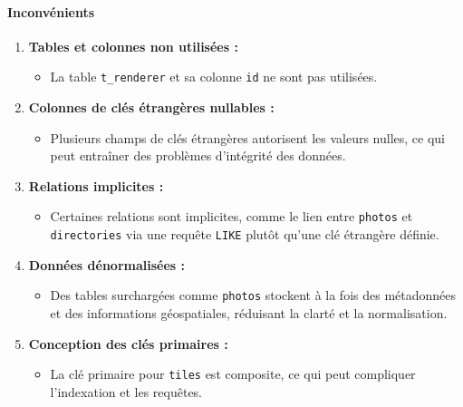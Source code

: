 \paragraph{Inconvénients}
\begin{enumerate}
    \item \textbf{Tables et colonnes non utilisées :}
          \begin{itemize}
              \item La table \texttt{t_renderer} et sa colonne \texttt{id} ne sont pas utilisées.
          \end{itemize}
    \item \textbf{Colonnes de clés étrangères nullables :}
          \begin{itemize}
              \item Plusieurs champs de clés étrangères autorisent les valeurs nulles, ce qui peut entraîner des problèmes d'intégrité des données.
          \end{itemize}
    \item \textbf{Relations implicites :}
          \begin{itemize}
              \item Certaines relations sont implicites, comme le lien entre \texttt{photos} et \texttt{directories} via une requête \texttt{LIKE} plutôt qu'une clé étrangère définie.
          \end{itemize}
    \item \textbf{Données dénormalisées :}
          \begin{itemize}
              \item Des tables surchargées comme \texttt{photos} stockent à la fois des métadonnées et des informations géospatiales, réduisant la clarté et la normalisation.
          \end{itemize}
    \item \textbf{Conception des clés primaires :}
          \begin{itemize}
              \item La clé primaire pour \texttt{tiles} est composite, ce qui peut compliquer l'indexation et les requêtes.
          \end{itemize}
\end{enumerate}

